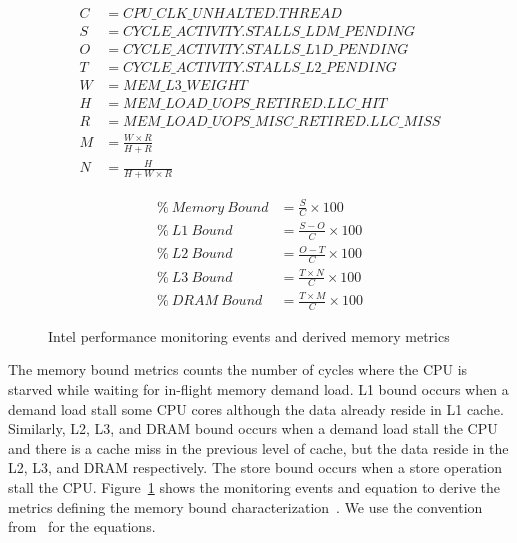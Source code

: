 \documentclass[conference]{IEEEtran}
\begin{document}
\begin{figure}[ht]
	\noindent
	\begin{minipage}
		{0.5\textwidth}
		\begin{align*}
			C & = CPU\_CLK\_UNHALTED.THREAD                \\
			S & = CYCLE\_ACTIVITY.STALLS\_LDM\_PENDING     \\
			O & = CYCLE\_ACTIVITY.STALLS\_L1D\_PENDING     \\
			T & = CYCLE\_ACTIVITY.STALLS\_L2\_PENDING      \\
			W & = MEM\_L3\_WEIGHT                          \\
			H & = MEM\_LOAD\_UOPS\_RETIRED.LLC\_HIT        \\
			R & = MEM\_LOAD\_UOPS\_MISC\_RETIRED.LLC\_MISS \\
			M & = \frac{W \times R}{H + R}                 \\
			N & = \frac{H}{H + W \times R}                 
		\end{align*}
	\end{minipage}
	\begin{minipage}
		{0.5\textwidth}
		\begin{align}
			\%~Memory~Bound & = \frac{S}{C} \times 100          \\
			\%~L1~Bound     & = \frac{S - O}{C} \times 100      \\
			\%~L2~Bound     & = \frac{O - T}{C} \times 100      \\
			\%~L3~Bound     & = \frac{T \times N}{C} \times 100 \\
			\%~DRAM~Bound   & = \frac{T \times M}{C} \times 100 
		\end{align}
	\end{minipage}
	\caption{Intel performance monitoring events and derived memory metrics}
	\label{fig:memory-metrics}
\end{figure}
			
The memory bound metrics counts the number of cycles where the CPU is starved while waiting for in-flight memory demand load. L1 bound occurs when a demand load stall some CPU cores although the data already reside in L1 cache. Similarly, L2, L3, and DRAM bound occurs when a demand load stall the CPU and there is a cache miss in the previous level of cache, but the data reside in the L2, L3, and DRAM respectively. The store bound occurs when a store operation stall the CPU. Figure~\ref{fig:memory-metrics} shows the monitoring events and equation to derive the metrics defining the memory bound characterization~\cite{Intel2006-lc}. We use the convention from~\cite{Kukunas2015-jd} for the equations.
			
\end{document}
